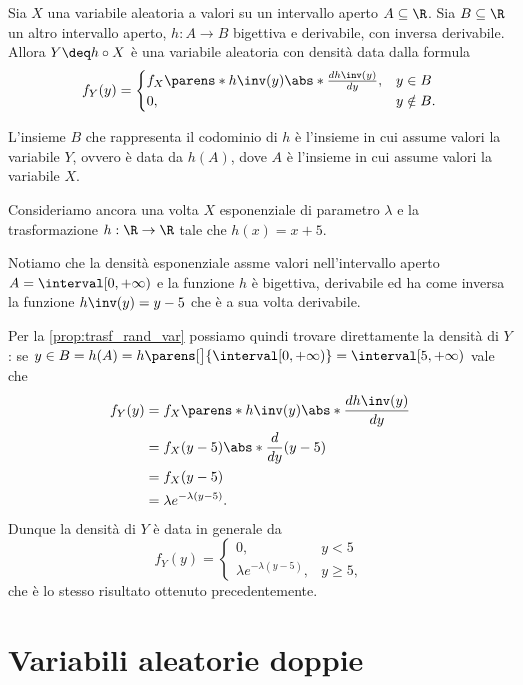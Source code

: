 \begin{proposition} \label{prop:trasf_rand_var}
    Sia $X$ una variabile aleatoria a valori su un intervallo aperto $A \subseteq \R$. Sia $B \subseteq \R$ un altro intervallo aperto, $h : A \to B$ bigettiva e derivabile, con inversa derivabile. Allora $Y \deq h \circ X$ è una variabile aleatoria con densità data dalla formula \[
        f_Y(y) = \begin{cases}
            f_X\parens*{h\inv(y)} \abs*{\frac{dh\inv(y)}{dy}}, &y \in B\\
            0, &y \notin B.
        \end{cases}    
    \]
\end{proposition}

L'insieme $B$ che rappresenta il codominio di $h$ è l'insieme in cui assume valori la variabile $Y$, ovvero è data da $h(A)$, dove $A$ è l'insieme in cui assume valori la variabile $X$.

\begin{example}
    Consideriamo ancora una volta $X$ esponenziale di parametro $\lambda$ e la trasformazione $h : \R \to \R$ tale che $h(x) = x + 5$.

    Notiamo che la densità esponenziale assme valori nell'intervallo aperto $A = \interval[{0, +\infty})$ e la funzione $h$ è bigettiva, derivabile ed ha come inversa la funzione $h\inv(y) = y - 5$ che è a sua volta derivabile. 
    
    Per la \autoref{prop:trasf_rand_var} possiamo quindi trovare direttamente la densità di $Y$:
    se $y \in B = h(A) = h\parens[\big]{\interval[{0, +\infty})} = \interval[{5, +\infty})$ vale che \begin{align*}
        f_Y(y) &= f_X\parens*{h\inv(y)} \abs*{\frac{dh\inv(y)}{dy}}\\
        &= f_X(y - 5) \abs*{\frac{d}{dy}(y - 5)}\\
        &= f_X(y-5)\\
        &= \lambda e^{-\lambda(y-5)}.
    \end{align*} Dunque la densità di $Y$ è data in generale da \[
        f_Y(y) = \begin{cases}
            0, &y < 5\\
            \lambda e^{-\lambda(y-5)}, &y \geq 5,
        \end{cases}
    \] che è lo stesso risultato ottenuto precedentemente.
\end{example}

\section{Variabili aleatorie doppie}

